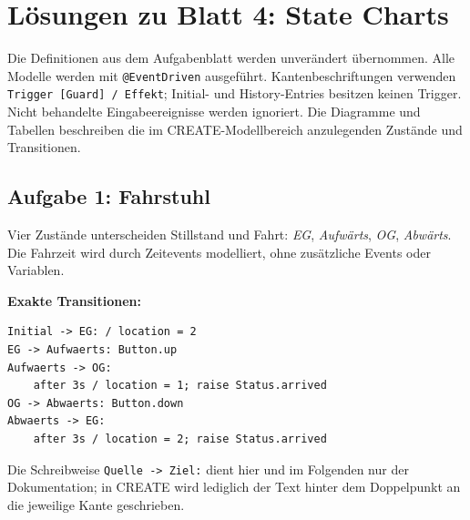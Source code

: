 \newcommand{\printpraesenzlsg}{false}
\newcommand{\printloesungen}{true}
\newcommand{\printbewertungen}{false}
\newcommand{\blattnummer}{4}

\usetikzlibrary{automata,arrows.meta,positioning,fit,backgrounds}

\section*{Lösungen zu Blatt 4: State Charts}
Die Definitionen aus dem Aufgabenblatt werden unverändert übernommen. Alle Modelle werden mit \texttt{@EventDriven} ausgeführt. Kantenbeschriftungen verwenden \texttt{Trigger [Guard] / Effekt}; Initial- und History-Entries besitzen keinen Trigger. Nicht behandelte Eingabeereignisse werden ignoriert. Die Diagramme und Tabellen beschreiben die im CREATE-Modellbereich anzulegenden Zustände und Transitionen.

\subsection*{Aufgabe 1: Fahrstuhl}
Vier Zustände unterscheiden Stillstand und Fahrt: \textit{EG}, \textit{Aufwärts}, \textit{OG}, \textit{Abwärts}. Die Fahrzeit wird durch Zeitevents modelliert, ohne zusätzliche Events oder Variablen.
\begin{center}
\end{center}
\textbf{Exakte Transitionen:}
\begin{lstlisting}
Initial -> EG: / location = 2
EG -> Aufwaerts: Button.up
Aufwaerts -> OG:
    after 3s / location = 1; raise Status.arrived
OG -> Abwaerts: Button.down
Abwaerts -> EG:
    after 3s / location = 2; raise Status.arrived
\end{lstlisting}
Die Schreibweise \texttt{Quelle -> Ziel:} dient hier und im Folgenden nur der Dokumentation; in CREATE wird lediglich der Text hinter dem Doppelpunkt an die jeweilige Kante geschrieben.

